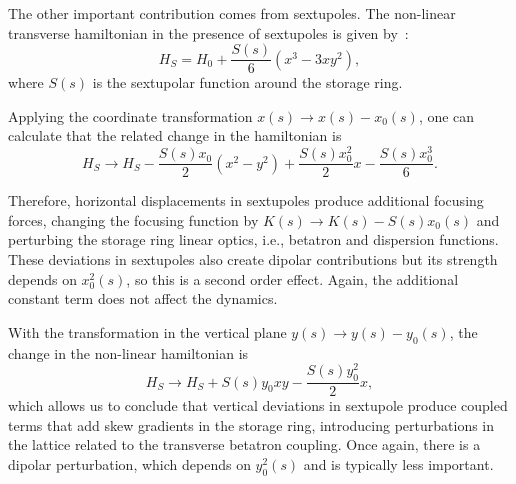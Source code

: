 The other important contribution comes from sextupoles. The non-linear transverse hamiltonian in the presence of sextupoles is given by~\cite{wiedemann2007physics}:
\begin{equation}
    H_S = H_0 + \dfrac{S(s)}{6}\left(x^3 - 3xy^2\right),
\end{equation}
where $S(s)$ is the sextupolar function around the storage ring.

Applying the coordinate transformation $x(s) \rightarrow x(s) - x_0(s)$, one can calculate that the related change in the hamiltonian is
\begin{equation}
    H_S \rightarrow H_S - \dfrac{S(s)x_0}{2}\left(x^2 - y^2\right) + \dfrac{S(s)x_0^2}{2}x - \dfrac{S(s)x_0^3}{6}.
\end{equation}

Therefore, horizontal displacements in sextupoles produce additional focusing forces, changing the focusing function by $K(s) \rightarrow K(s) - S(s)x_0(s)$ and perturbing the storage ring linear optics, i.e., betatron and dispersion functions. These deviations in sextupoles also create dipolar contributions but its strength depends on $x^2_0(s)$, so this is a second order effect. Again, the additional constant term does not affect the dynamics.

With the transformation in the vertical plane $y(s) \rightarrow y(s) - y_0(s)$, the change in the non-linear hamiltonian is
\begin{equation}
    H_S \rightarrow H_S + S(s)y_0 xy - \dfrac{S(s)y_0^2}{2}x,
\end{equation}
which allows us to conclude that vertical deviations in sextupole produce coupled terms that add skew gradients in the storage ring, introducing perturbations in the lattice related to the transverse betatron coupling. Once again, there is a dipolar perturbation, which depends on $y^2_0(s)$ and is typically less important.